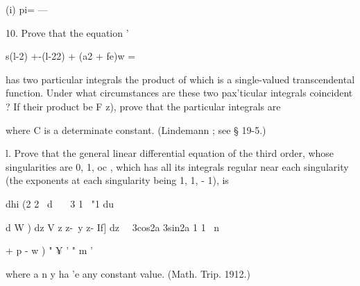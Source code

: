 (i) pi= —%

10. Prove that the equation ' 

s(l-2)  +-(l-22)  + (a2 + fe)w = 

has two particular integrals the product of which is a single-valued transcendental 
function. Under what circumstances are these two pax'ticular integrals coincident ? 
If their product be F z), prove that the particular integrals are 

where C is a determinate constant. (Lindemann ; see § 19-5.) 

l.  Prove that the general linear differential equation of the third order, whose 
singularities are 0, 1, oc , which has all its integrals regular near each singularity (the 
exponents at each singularity being 1, 1, - 1), is 

dhi (2 2 \ d \  \ \   3 1 \ "1 du 

d W  ) dz  V z z-\ y z- If] dz 
\ \  3cos2a 3sin2a 1 1 \ n 

+ p - w ) "  ¥ ' "   m ' 

where a n y ha 'e any constant value. (Math. Trip. 1912.) 

